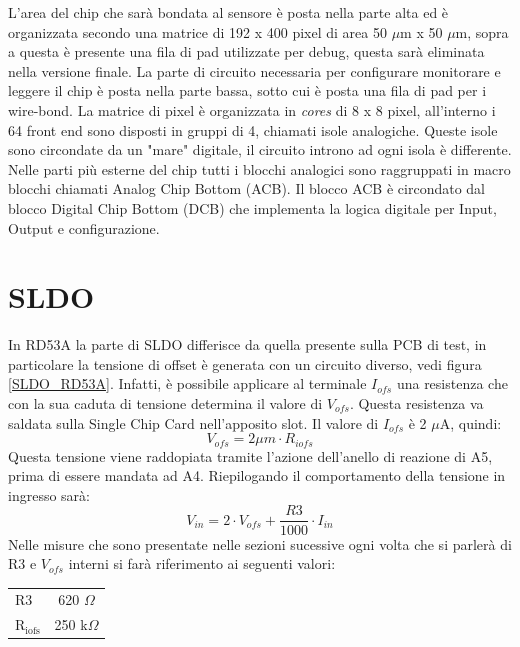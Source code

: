 L'area del chip che sarà bondata al sensore è posta nella parte alta ed è organizzata secondo una matrice di 192 x 400 pixel di area 50 $\mu$m x 50 $\mu$m, sopra a questa è presente una fila di pad utilizzate per debug, questa sarà eliminata nella versione finale. La parte di circuito necessaria per configurare monitorare e leggere il chip è posta nella parte bassa, sotto cui è posta una fila di pad per i wire-bond. 
La matrice di pixel è organizzata in \textit{cores} di 8 x 8 pixel, all'interno i 64 front end sono disposti in gruppi di 4, chiamati isole analogiche. 
Queste isole sono circondate da un "mare" digitale, il circuito introno ad ogni isola è differente. 
Nelle parti più esterne del chip tutti i blocchi analogici sono raggruppati in macro blocchi chiamati Analog Chip Bottom (ACB). Il blocco ACB è circondato dal blocco Digital Chip Bottom (DCB) che implementa la logica digitale per Input, Output e configurazione.

\section{SLDO}
In RD53A la parte di SLDO differisce da quella presente sulla PCB di test, in particolare la tensione di offset è generata con un circuito diverso, vedi figura \ref{SLDO_RD53A}. Infatti, è possibile applicare al terminale $I_{ofs}$ una resistenza che con la sua caduta di tensione determina il valore di $V_{ofs}$. 
Questa resistenza va saldata sulla Single Chip Card nell'apposito slot. Il valore di $I_{ofs}$ è 2 $\mu$A, quindi:
\begin{equation}
V_{ofs} = 2 \mu m \cdot R_{iofs}
\end{equation}
Questa tensione viene raddopiata tramite l'azione dell'anello di reazione di A5, prima di essere mandata ad A4.
Riepilogando il comportamento della tensione in ingresso sarà:
\begin{equation}
V_{in}= 2 \cdot V_{ofs} + \dfrac{R3}{1000} \cdot I_{in}
\end{equation}
Nelle misure che sono presentate nelle sezioni sucessive ogni volta che si parlerà di R3 e $V_{ofs}$ interni si farà riferimento ai seguenti valori:

\begin{center}
\begin{tabular}{lc}
\hline
$\mathrm{R3}$ & 620 $\Omega$ \\
$\mathrm{R_{iofs}}$ & 250 k$\Omega$\\ 
\hline
\end{tabular}
\end{center}

